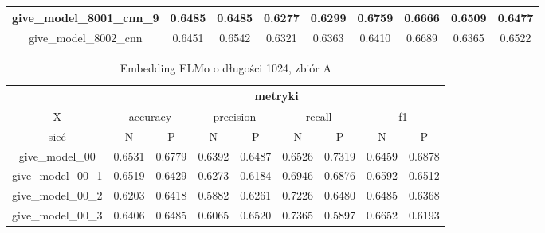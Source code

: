 \begin{table}[!h]
\begin{tabular}{|c|c|c|c|c|c|c|c|c|}
        give\_model\_8001\_cnn\_9         & 0.6485                        & 0.6485                         & 0.6277                      & 0.6299                  & 0.6759 & 0.6666 & 0.6509 & 0.6477 \\ \hline
        give\_model\_8002\_cnn            & 0.6451                        & 0.6542                         & 0.6321                      & 0.6363                  & 0.6410 & 0.6689 & 0.6365 & 0.6522 \\ \hline
    \end{tabular}
\end{table}


\begin{table}[!h] \label{tab:wyniki_fastext_A} \centering
    \caption{Embedding ELMo o długości 1024, zbiór A}
    \begin{tabular}{|c|c|c|c|c|c|c|c|c|}    \hline
                                          & \multicolumn{8}{c|}{metryki}                                                                                                                               \\ \hline
        X                                 & \multicolumn{2}{c|}{accuracy} & \multicolumn{2}{c|}{precision} & \multicolumn{2}{c|}{recall} & \multicolumn{2}{c|}{f1}                                     \\ \hline
        sieć                              & N                             & P                              & N                           & P                       & N      & P      & N      & P      \\ \hline
        give\_model\_00                   & 0.6531                        & 0.6779                         & 0.6392                      & 0.6487                  & 0.6526 & 0.7319 & 0.6459 & 0.6878 \\ \hline
        give\_model\_00\_1                & 0.6519                        & 0.6429                         & 0.6273                      & 0.6184                  & 0.6946 & 0.6876 & 0.6592 & 0.6512 \\ \hline
        give\_model\_00\_2                & 0.6203                        & 0.6418                         & 0.5882                      & 0.6261                  & 0.7226 & 0.6480 & 0.6485 & 0.6368 \\ \hline
        give\_model\_00\_3                & 0.6406                        & 0.6485                         & 0.6065                      & 0.6520                  & 0.7365 & 0.5897 & 0.6652 & 0.6193 \\ \hline

\end{tabular}
\end{table}

